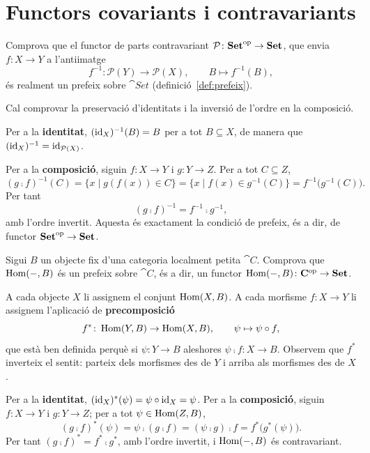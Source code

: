 \section{Functors covariants i contravariants}

\begin{exercici}\label{pr-parts-contra}
Comprova que el functor de parts contravariant $\mathcal P\colon\mathbf{Set}^{\mathrm{op}}\to\mathbf{Set}$, que envia $f\colon X\to Y$ a l'antiimatge
\[
f^{-1}\colon\mathcal P(Y)\to\mathcal P(X),
\qquad
B\mapsto f^{-1}(B),
\]
és realment un prefeix sobre $\cat{Set}$ (definició~\ref{def:prefeix}).
\end{exercici}

\begin{solucio}
Cal comprovar la preservació d'identitats i la inversió de l'ordre en la composició.

Per a la \textbf{identitat}, $(\operatorname{id}_X)^{-1}(B)=B$ per a tot $B\subseteq X$, de manera que $(\operatorname{id}_X)^{-1}=\operatorname{id}_{\mathcal P(X)}$.

Per a la \textbf{composició}, siguin $f\colon X\to Y$ i $g\colon Y\to Z$. Per a tot $C\subseteq Z$,
\[
(g\comp f)^{-1}(C)=\{x\mid g(f(x))\in C\}=\{x\mid f(x)\in g^{-1}(C)\}=f^{-1}\big(g^{-1}(C)\big).
\]
Per tant
\[
(g\comp f)^{-1}=f^{-1}\comp g^{-1},
\]
amb l'ordre invertit. Aquesta és exactament la condició de prefeix, és a dir, de functor $\mathbf{Set}^{\mathrm{op}}\to\mathbf{Set}$.
\end{solucio}

\begin{exercici}\label{pr-hom-contra}
Sigui $B$ un objecte fix d'una categoria localment petita $\cat{C}$. Comprova que $\operatorname{Hom}(-,B)$ és un prefeix sobre $\cat{C}$, és a dir, un functor $\operatorname{Hom}(-,B)\colon\mathbf{C}^{\mathrm{op}}\to\mathbf{Set}$.
\end{exercici}

\begin{solucio}
A cada objecte $X$ li assignem el conjunt $\operatorname{Hom}(X,B)$. A cada morfisme $f\colon X\to Y$ li assignem l'aplicació de \textbf{precomposició}
\[
f^*\colon\operatorname{Hom}(Y,B)\to\operatorname{Hom}(X,B),
\qquad
\psi\mapsto\psi\circ f,
\]
que està ben definida perquè si $\psi\colon Y\to B$ aleshores $\psi\comp f\colon X\to B$. Observem que $f^*$ inverteix el sentit: parteix dels morfismes des de $Y$ i arriba als morfismes des de $X$.

Per a la \textbf{identitat}, $(\operatorname{id}_X)^*(\psi)=\psi\circ\operatorname{id}_X=\psi$. Per a la \textbf{composició}, siguin $f\colon X\to Y$ i $g\colon Y\to Z$; per a tot $\psi\in\operatorname{Hom}(Z,B)$,
\[
(g\comp f)^*(\psi)=\psi\comp(g\comp f)=(\psi\comp g)\comp f=f^*\big(g^*(\psi)\big).
\]
Per tant $(g\comp f)^*=f^*\comp g^*$, amb l'ordre invertit, i $\operatorname{Hom}(-,B)$ és contravariant.
\end{solucio}

